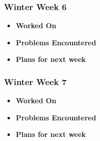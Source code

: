 \documentclass[compsoc,draftclsnofoot,onecolumn,10pt]{IEEEtran}
\begin{document}
\subsubsection{Winter Week 6}
\begin{itemize}
    \item {\textbf{Worked On}}
    \begin{itemize}

    \end{itemize}

    \item {\textbf{Problems Encountered}}
    \begin{itemize}

    \end{itemize}

    \item{\textbf{Plans for next week}}
    \begin{itemize}

    \end{itemize}

\end{itemize}

\subsubsection{Winter Week 7}
\begin{itemize}
    \item {\textbf{Worked On}}
    \begin{itemize}

    \end{itemize}

    \item {\textbf{Problems Encountered}}
    \begin{itemize}

    \end{itemize}

    \item{\textbf{Plans for next week}}
    \begin{itemize}

    \end{itemize}

\end{itemize}
\end{document}
